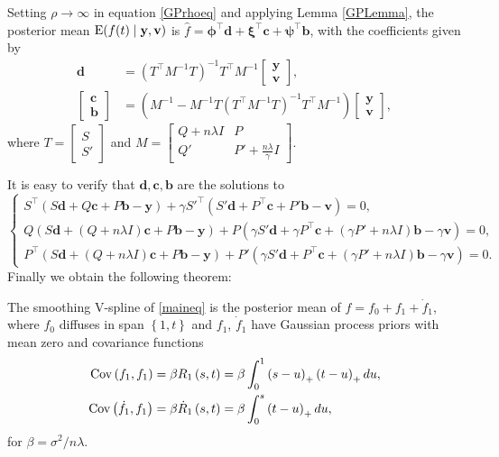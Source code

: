 Setting $\rho \rightarrow \infty$ in equation \eqref{GPrhoeq} and applying Lemma \ref{GPLemma}, the posterior mean $\mathrm{E} (f(t)\mid \mathbf{y},\mathbf{v})$ is $\hat{f}  = \mathbf{\phi}^\top \mathbf{d}+\mathbf{\xi}^\top \mathbf{c}+\mathbf{\psi}^\top \mathbf{b}$, with the coefficients given by
\begin{align} 
\mathbf{d}&=\left(T^\top M^{-1}T\right)^{-1}T^\top M^{-1}\begin{bmatrix}\mathbf{y} \\ \mathbf{v} \end{bmatrix},\\
\begin{bmatrix}\mathbf{c}\\ \mathbf{b}\end{bmatrix} &=
\left(M^{-1}-M^{-1}T\left(T^\top M^{-1} T\right)^{-1}T^\top M^{-1}\right)\begin{bmatrix}\mathbf{y}\\ \mathbf{v} \end{bmatrix},
\end{align} 
where $T=\begin{bmatrix} S\\S' \end{bmatrix}$ and $M=\begin{bmatrix} Q+n\lambda I& P\\
Q'& P'+\frac{n\lambda}{\gamma}I
\end{bmatrix}$.

It is easy to verify that $\mathbf{d},\mathbf{c},\mathbf{b}$ are the solutions to
\begin{equation}
\begin{cases}
S^\top \left(S\mathbf{d} +Q\mathbf{c}+P\mathbf{b}-\mathbf{y}\right) +\gamma S'^\top\left( S'\mathbf{d}+ P^\top \mathbf{c}+ P'\mathbf{b}-\mathbf{v}\right)=0, \\
Q\left(S\mathbf{d}+\left(Q+n\lambda I\right)\mathbf{c}+P\mathbf{b}-\mathbf{y}\right) + P \left( \gamma S' \mathbf{d} + \gamma P^\top \mathbf{c}+ \left(\gamma P'+n\lambda I\right) \mathbf{b}- \gamma \mathbf{v}\right)=0, \\
P^\top \left(S\mathbf{d}+\left(Q+n\lambda I\right) \mathbf{c} +P\mathbf{b}-\mathbf{y}\right)+P'\left(\gamma S'\mathbf{d}+P^\top \mathbf{c}+\left(\gamma P'+n\lambda I\right)\mathbf{b}- \gamma\mathbf{v}\right)=0.
\end{cases}
\end{equation}
Finally we obtain the following theorem: 
\begin{theorem}
The smoothing V-spline of \eqref{maineq} is the posterior
mean of $f=f_0+f_1 + \dot{f}_1$, where $f_0$ diffuses in span $\left\lbrace 1,t\right\rbrace$ and $f_1$, $\dot{f}_1$ have Gaussian process priors with mean zero and covariance functions
\begin{align}
\mathrm{Cov} \left(f_1,f_1\right)   &= \beta R_1\left(s,t\right)   =\beta \int_{0}^{1} \left(s-u\right)_+\left(t-u\right)_+du, \\
\mathrm{Cov} \left(\dot{f}_1,f_1\right)  &= \beta \dot{R}_1\left(s,t\right) =\beta \int_0^s\left(t-u\right)_+du,
\end{align}
for $\beta = \sigma^2/n\lambda$.
\end{theorem}



